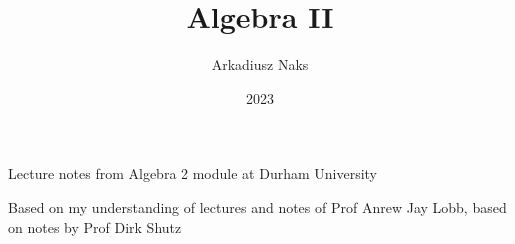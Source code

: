 \documentclass[12pt, letterpaper]{article}
\title{Algebra II}
\author{Arkadiusz Naks}
\date{2023}
\begin{document}
\begin{titlepage}
  \begin{center}
    \makeatletter
    \vspace*{1cm}
    \Huge
    \textbf{\@title}

    \vspace{0.5cm}
    \Large
    Lecture notes from Algebra 2 module at Durham University

    \vspace{1.5cm}

    \textbf{\@author}

    \vfill

    \vspace{0.8cm}

    \small
    Based on my understanding of lectures and notes of Prof Anrew Jay Lobb, based on notes by Prof Dirk Shutz\\
    \@date{}
  \end{center}
\end{titlepage}
\end{document}

